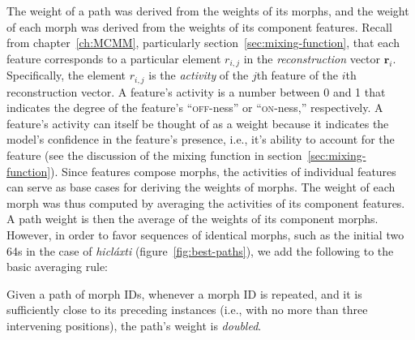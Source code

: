 {The weight of a path was derived from
 the weights of its morphs, and the weight of each morph was derived from the weights of its component features. 
Recall from chapter~\ref{ch:MCMM}, particularly section~\ref{sec:mixing-function}, that each feature corresponds 
to a particular element $r_{i,j}$ in the \emph{reconstruction} 
vector $\mathbf{r}_{i}$. Specifically, the element $r_{i,j}$ is the \emph{activity} 
of the $j$th feature of the $i$th reconstruction vector. A feature's 
activity is a number between 0 and 1 that indicates the degree of the 
feature's ``\textsc{off}-ness'' or ``\textsc{on}-ness,'' respectively. A 
feature's activity can itself be thought of as a weight because it indicates 
the model's confidence in the feature's presence, i.e., it's ability to 
account for the feature (see the discussion of the mixing function in section~\ref{sec:mixing-function}). 
Since features compose morphs, the activities of individual features can serve as base cases for deriving the weights of morphs. The weight of each morph was thus computed by averaging the activities of its component features. 
A path weight is then the average of the weights of its component morphs. However, in order to favor 
sequences of identical morphs, such as the initial two 64s in the case of \textit{hicl\'{a}xti} (figure~\ref{fig:best-paths}), 
we add the following to the basic averaging rule:
\newline
\begin{nbquote}\noindent
Given a path of morph IDs, 
whenever a morph ID is repeated, and it is sufficiently close to its preceding instances (i.e., with no more than three intervening positions), the path's weight is \emph{doubled}.
\end{nbquote}


}
